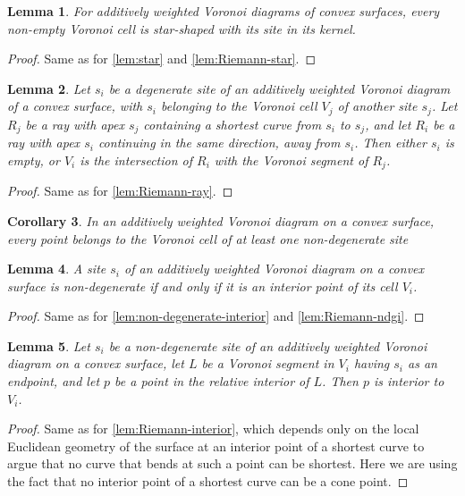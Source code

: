 \documentclass[11pt]{article}
\newtheorem{lemma}{Lemma}
\newtheorem{corollary}[lemma]{Corollary}
\theoremstyle{definition}
\begin{document}
\begin{lemma}
For additively weighted Voronoi diagrams of convex surfaces, every non-empty Voronoi cell is star-shaped with its site in its kernel.
\end{lemma}

\begin{proof}
Same as for \cref{lem:star} and \cref{lem:Riemann-star}.
\end{proof}

\begin{lemma}
Let $s_i$ be a degenerate site of an additively weighted Voronoi diagram of a convex surface, with $s_i$ belonging to the Voronoi cell $V_j$ of another site $s_j$. Let $R_j$ be a ray with apex $s_j$ containing a shortest curve from $s_i$ to $s_j$, and let $R_i$ be a ray with apex $s_i$ continuing in the same direction, away from $s_i$. Then either $s_i$ is empty, or $V_i$ is the intersection of $R_i$ with the Voronoi segment of $R_j$.
\end{lemma}

\begin{proof}
Same as for \cref{lem:Riemann-ray}.
\end{proof}

\begin{corollary}
In an additively weighted Voronoi diagram on a convex surface, every point belongs to the Voronoi cell of at least one non-degenerate site
\end{corollary}

\begin{lemma}
A site $s_i$ of an additively weighted Voronoi diagram on a convex surface is non-degenerate if and only if it is an interior point of its cell $V_i$.
\end{lemma}

\begin{proof}
Same as for \cref{lem:non-degenerate-interior} and \cref{lem:Riemann-ndgi}.
\end{proof}

\begin{lemma}
Let $s_i$ be a non-degenerate site of an additively weighted Voronoi diagram on a convex surface, let $L$ be a Voronoi segment in $V_i$ having $s_i$ as an endpoint, and let $p$ be a point in the relative interior of $L$. Then $p$ is interior to $V_i$.
\end{lemma}

\begin{proof}
Same as for \cref{lem:Riemann-interior}, which depends only on the local Euclidean geometry of the surface at an interior point of a shortest curve to argue that no curve that bends at such a point can be shortest. Here we are using the fact that no interior point of a shortest curve can be a cone point.
\end{proof}
\end{document}
